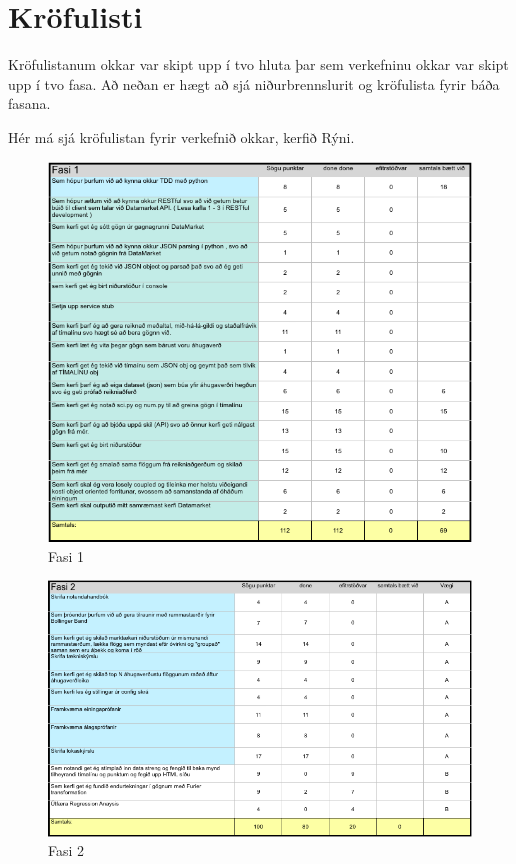 \documentclass{article}
\begin{document}
\raggedright

\tableofcontents
\newpage
\section{Kröfulisti}
Kröfulistanum okkar var skipt upp í tvo hluta þar sem verkefninu okkar var skipt upp í tvo fasa. Að neðan er hægt að sjá niðurbrennslurit og kröfulista fyrir báða fasana.

Hér má sjá kröfulistan fyrir verkefnið okkar, kerfið Rýni.

\begin{figure}[H]
  \centering
  \includegraphics[width=1\textwidth]{Fasi1.png} 
  \caption{Fasi 1} 
\end{figure}

\begin{figure}[H]
  \centering
  \includegraphics[width=1\textwidth]{Fasi2.png} 
  \caption{Fasi 2} 
\end{figure}
\end{document}
